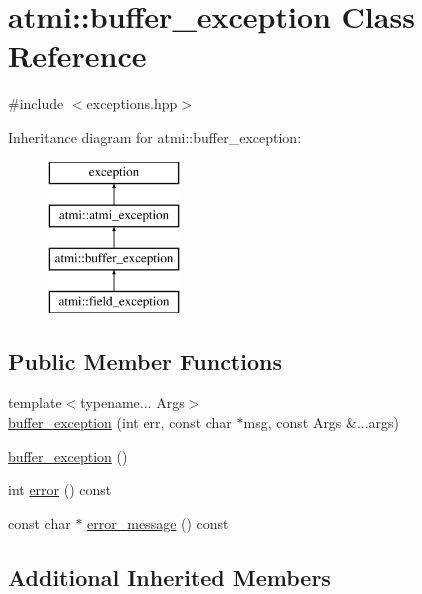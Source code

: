 \hypertarget{classatmi_1_1buffer__exception}{\section{atmi\+:\+:buffer\+\_\+exception Class Reference}
\label{classatmi_1_1buffer__exception}
}


{\ttfamily \#include $<$exceptions.\+hpp$>$}

Inheritance diagram for atmi\+:\+:buffer\+\_\+exception\+:\begin{figure}[H]
\begin{center}
\leavevmode
\includegraphics[height=4.000000cm]{classatmi_1_1buffer__exception}
\end{center}
\end{figure}
\subsection*{Public Member Functions}
\begin{DoxyCompactItemize}
\item 
{\footnotesize template$<$typename... Args$>$ }\\\hyperlink{classatmi_1_1buffer__exception_aff48a3528d8a2d575a194233f454bd40}{buffer\+\_\+exception} (int err, const char $\ast$msg, const Args \&...args)
\item 
\hyperlink{classatmi_1_1buffer__exception_a25ef1cb87d75bfca1577f298466e77a0}{buffer\+\_\+exception} ()
\item 
int \hyperlink{classatmi_1_1buffer__exception_a8d9475dbaa7d9864b906dc6ea9818351}{error} () const 
\item 
const char $\ast$ \hyperlink{classatmi_1_1buffer__exception_a6881332c2a607fb71b987eaf811723b7}{error\+\_\+message} () const 
\end{DoxyCompactItemize}
\subsection*{Additional Inherited Members}


